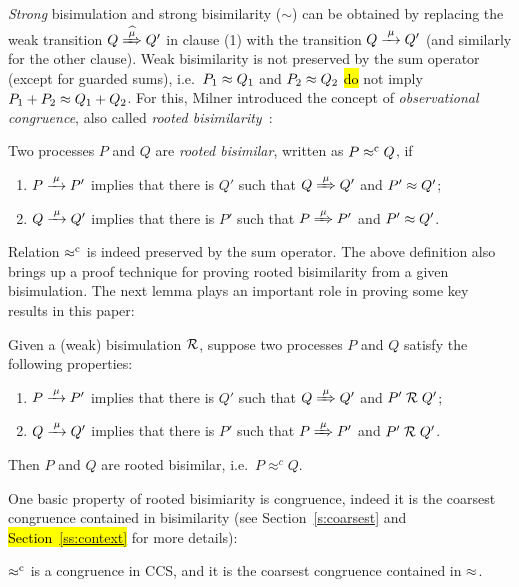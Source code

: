\emph{Strong} bisimulation and strong bisimilarity ($\sim$)
can be obtained by replacing the weak transition $Q\Arcap\mu Q'$ in 
clause (1) 
 with the transition $Q \arr \mu Q'$ (and similarly for the other clause).
Weak bisimilarity is not preserved by the sum operator (except for
guarded sums), i.e.~$P_1 \approx Q_1$ and $P_2 \approx Q_2$  \hl{do} not imply
 $P_1 + P_2 \approx Q_1 + Q_2$.
For this, Milner introduced the concept of \emph{observational congruence}, also called \emph{rooted
  bisimilarity}~\cite{Gorrieri:2015jt,Sangiorgi:2011ut}:
\begin{definition}%
\label{d:rootedBisimilarity}
Two processes $P$ and $Q$ are \emph{rooted bisimilar}, written as $P
\mathrel{\approx^{\rm{c}}} Q$, if %
\begin{enumerate}
 \item  $P \arr\mu P'$ implies that there is $Q'$ such that $Q
   \Arr\mu Q'$ and $P' \approx Q'$;
 \item  $Q \arr\mu Q'$ implies that there is $P'$ such that $P
   \Arr\mu P'$ and $P' \approx Q'$\enspace.
\end{enumerate}
\end{definition}
Relation $\mathrel{\approx^{\rm{c}}}$ is indeed preserved by the sum operator.
The above definition also brings up a proof technique for proving rooted
bisimilarity from a given bisimulation. The next
lemma plays an
important role in proving some key results in this paper:
\begin{lemma}
\label{l:obsCongrByWeakBisim}
Given a (weak) bisimulation $\mathrel{\cal R}$, suppose two processes $P$ and $Q$
satisfy the following properties:
\begin{enumerate}
\item $P \arr\mu P'$ implies that there is $Q'$ such that $Q
   \Arr\mu Q'$ and $P' \mathrel{\cal R} Q'$;
\item $Q \arr\mu Q'$ implies that there is $P'$ such that $P
   \Arr\mu P'$ and $P' \mathrel{\cal R} Q'$.
\end{enumerate}
Then $P$ and $Q$ are rooted bisimilar, i.e.~$P \approx^c Q$.
\end{lemma}

One basic property of rooted bisimiarity is congruence,
indeed it is  the coarsest congruence contained in bisimilarity
(see Section~\ref{s:coarsest} and \hl{\mbox{Section~\ref{ss:context}}} for more details):
\begin{theorem}
\label{t:rapproxCongruence}
$\mathrel{\approx^{\rm{c}}}$ is a congruence in CCS, and it is the
coarsest congruence contained in $\approx$.
\end{theorem}

